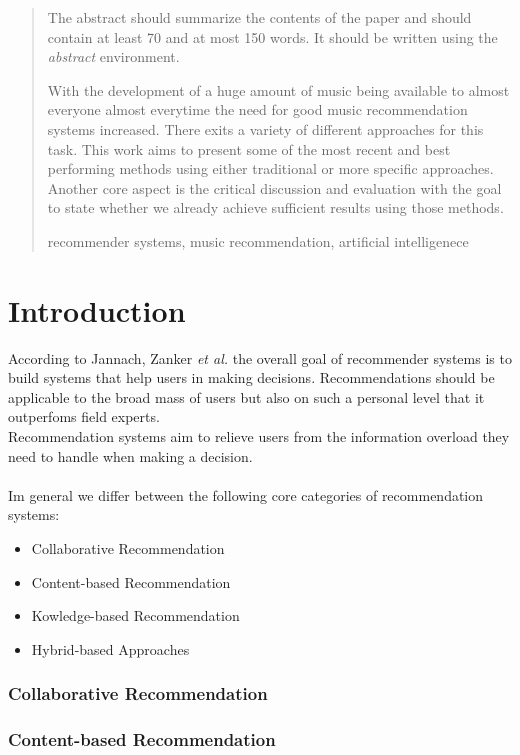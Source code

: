 \documentclass[runningheads,a4paper]{llncs}
\newcommand{\keywords}[1]{\par\addvspace\baselineskip
\noindent\keywordname\enspace\ignorespaces#1}
\begin{document}
\begin{abstract}
The abstract should summarize the contents of the paper and should
contain at least 70 and at most 150 words. It should be written using the
\emph{abstract} environment.

With the development of a huge amount of music being available to almost everyone almost everytime the need for good
music recommendation systems increased. 
There exits a variety of different approaches for this task. 
This work aims to present some of the most recent and best performing methods using 
either traditional or more specific approaches.
Another core aspect is the critical discussion and evaluation with the goal 
to state whether we already achieve sufficient results using those methods. 

\keywords{recommender systems, music recommendation, artificial intelligenece}
\end{abstract}

\section{Introduction}

According to Jannach, Zanker \textit{et al.} the overall goal of recommender systems is to build systems that help users in making decisions.
Recommendations should be applicable to the broad mass of users but also on such a personal level that it outperfoms field experts. \cite{jannach2010recommender}
\\
Recommendation systems aim to relieve users from the information overload they need to handle when 
making a decision.\\ 
\\
Im general we differ between the following core categories of recommendation systems: 
\begin{itemize}
  \item Collaborative Recommendation
  \item Content-based Recommendation
  \item Kowledge-based Recommendation
  \item Hybrid-based Approaches
\end{itemize}
\subsubsection{Collaborative Recommendation}
\subsubsection{Content-based Recommendation}
\end{document}
